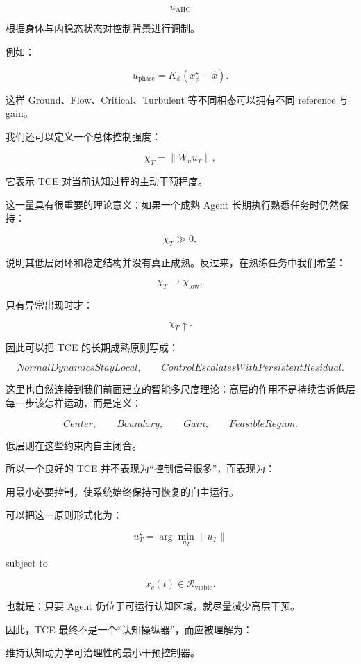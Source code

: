 \[
u_{\mathrm{AHC}}
\]

根据身体与内稳态状态对控制背景进行调制。

例如：

\[
u_{\mathrm{phase}}
=
K_{\phi}
\left(
x^\star_\phi-\hat x
\right).
\]

这样 Ground、Flow、Critical、Turbulent 等不同相态可以拥有不同 reference 与 gain。

我们还可以定义一个总体控制强度：

\[
\chi_T
=
\|W_u u_T\|,
\]

它表示 TCE 对当前认知过程的主动干预程度。

这一量具有很重要的理论意义：如果一个成熟 Agent 长期执行熟悉任务时仍然保持：

\[
\chi_T\gg0,
\]

说明其低层闭环和稳定结构并没有真正成熟。反过来，在熟练任务中我们希望：

\[
\chi_T\rightarrow
\chi_{\mathrm{low}},
\]

只有异常出现时才：

\[
\chi_T\uparrow.
\]

因此可以把 TCE 的长期成熟原则写成：

\[
\boxed{
NormalDynamicsStayLocal,
\qquad
ControlEscalatesWithPersistentResidual.
}
\]

这里也自然连接到我们前面建立的智能多尺度理论：高层的作用不是持续告诉低层每一步该怎样运动，而是定义：

\[
Center,\qquad
Boundary,\qquad
Gain,\qquad
FeasibleRegion.
\]

低层则在这些约束内自主闭合。

所以一个良好的 TCE 并不表现为“控制信号很多”，而表现为：

\begin{statementbox}
用最小必要控制，使系统始终保持可恢复的自主运行。
\end{statementbox}

可以把这一原则形式化为：

\[
u_T^\star
=
\arg\min_{u_T}
\|u_T\|
\]

subject to

\[
x_c(t)
\in
\mathcal R_{\mathrm{viable}}.
\]

也就是：只要 Agent 仍位于可运行认知区域，就尽量减少高层干预。

因此，TCE 最终不是一个“认知操纵器”，而应被理解为：

\begin{statementbox}
维持认知动力学可治理性的最小干预控制器。
\end{statementbox}

